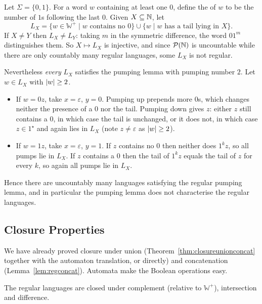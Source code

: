 \documentclass[a4paper]{scrartcl}
\newcommand{\WW}{\mathbb{W}}
\newcommand{\eps}{\varepsilon}
\begin{document}
\begin{example}\label{ex:pumpingnotsufficient}
	Let $\Sigma = \{0,1\}$. For a word $w$ containing at least one $0$, define the  of $w$ to be the number of $1$s following the last $0$. Given $X \subseteq \mathbb{N}$, let
	$$L_X = \{w \in \WW^+ \mid w \text{ contains no } 0\} \cup \{w \mid w \text{ has a tail lying in } X\}.$$
	If $X \neq Y$ then $L_X \neq L_Y$: taking $m$ in the symmetric difference, the word $01^m$ distinguishes them. So $X \mapsto L_X$ is injective, and since $\mathcal{P}(\mathbb{N})$ is uncountable while there are only countably many regular languages, some $L_X$ is not regular.

	Nevertheless \emph{every} $L_X$ satisfies the pumping lemma with pumping number $2$. Let $w \in L_X$ with $\lvert w\rvert \geq 2$.
	\begin{itemize}
		\item If $w = 0z$, take $x = \eps$, $y = 0$. Pumping up prepends more $0$s, which changes neither the presence of a $0$ nor the tail. Pumping down gives $z$: either $z$ still contains a $0$, in which case the tail is unchanged, or it does not, in which case $z \in 1^\star$ and again lies in $L_X$ (note $z \neq \eps$ as $\lvert w\rvert \geq 2$).
		\item If $w = 1z$, take $x = \eps$, $y = 1$. If $z$ contains no $0$ then neither does $1^kz$, so all pumps lie in $L_X$. If $z$ contains a $0$ then the tail of $1^kz$ equals the tail of $z$ for every $k$, so again all pumps lie in $L_X$.
	\end{itemize}
	Hence there are uncountably many languages satisfying the regular pumping lemma, and in particular the pumping lemma does not characterise the regular languages.
\end{example}

\subsection{Closure Properties}

We have already proved closure under union (Theorem~\ref{thm:closureunionconcat} together with the automaton translation, or directly) and concatenation (Lemma~\ref{lem:regconcat}). Automata make the Boolean operations easy.

\begin{proposition}\label{prop:regcomplement}
	The regular languages are closed under complement (relative to $\WW^+$), intersection and difference.
\end{proposition}
\end{document}
